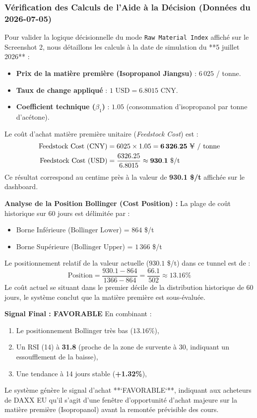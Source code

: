 \documentclass[12pt,a4paper]{article}
\begin{document}
\subsubsection{Vérification des Calculs de l'Aide à la Décision (Données du 2026-07-05)}
Pour valider la logique décisionnelle du mode \texttt{Raw Material Index} affiché sur le Screenshot 2, nous détaillons les calculs à la date de simulation du **5 juillet 2026** :
\begin{itemize}
    \item \textbf{Prix de la matière première (Isopropanol Jiangsu)} : $6\,025$ \yen / tonne.
    \item \textbf{Taux de change appliqué} : $\text{1 USD} = 6.8015\text{ CNY}$.
    \item \textbf{Coefficient technique ($\beta_1$)} : $1.05$ (consommation d'isopropanol par tonne d'acétone).
\end{itemize}

Le coût d'achat matière première unitaire (\textit{Feedstock Cost}) est :
\begin{align*}
\text{Feedstock Cost (CNY)} &= 6025 \times 1.05 = \mathbf{6\,326.25\text{ \yen{} / tonne}} \\
\text{Feedstock Cost (USD)} &= \frac{6326.25}{6.8015} \approx \mathbf{930.1\text{ \$/t}}
\end{align*}
Ce résultat correspond au centime près à la valeur de \textbf{930.1 \$/t} affichée sur le dashboard.

\textbf{Analyse de la Position Bollinger (Cost Position) :}
La plage de coût historique sur 60 jours est délimitée par :
\begin{itemize}
    \item Borne Inférieure ($\text{Bollinger Lower}$) = $864$ \$/t
    \item Borne Supérieure ($\text{Bollinger Upper}$) = $1\,366$ \$/t
\end{itemize}
Le positionnement relatif de la valeur actuelle ($930.1$ \$/t) dans ce tunnel est de :
\begin{equation*}
\text{Position} = \frac{930.1 - 864}{1366 - 864} = \frac{66.1}{502} \approx \mathbf{13.16\%}
\end{equation*}
Le coût actuel se situant dans le premier décile de la distribution historique de 60 jours, le système conclut que la matière première est sous-évaluée.

\textbf{Signal Final : FAVORABLE}
En combinant :
\begin{enumerate}
    \item Le positionnement Bollinger très bas ($13.16\%$),
    \item Un RSI (14) à \textbf{31.8} (proche de la zone de survente à 30, indiquant un essoufflement de la baisse),
    \item Une tendance à 14 jours stable (\textbf{+1.32\%}),
\end{enumerate}
Le système génère le signal d'achat **`FAVORABLE`**, indiquant aux acheteurs de DAXX EU qu'il s'agit d'une fenêtre d'opportunité d'achat majeure sur la matière première (Isopropanol) avant la remontée prévisible des cours.
\end{document}
